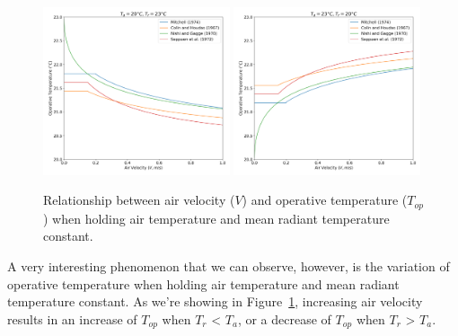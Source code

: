 {\begin{figure}
            \includegraphics[width=0.49\textwidth]{figures/Ta20_Tr23.png}
            \includegraphics[width=0.49\textwidth]{figures/Ta23_Tr20.png}
            \caption{Relationship between air velocity ($V$) and operative temperature ($T_{op}$) when holding air temperature and mean radiant temperature constant.}
            \label{fig:Top_AR}
    \end{figure}
    }
        
    A very interesting phenomenon that we can observe, however, is the variation of operative temperature when holding air temperature and mean radiant temperature constant. As we're showing in Figure~\ref{fig:Top_AR}, increasing air velocity results in an increase of $T_{op}$ when $T_r$ < $T_a$, or a decrease of $T_{op}$ when $T_r$ > $T_a$. 
        
